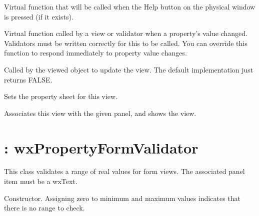 
Virtual function that will be called when the Help button on the physical window is pressed (if it exists).

\label{wxpropertyviewonpropertychanged}


Virtual function called by a view or validator when a property's value changed. Validators
must be written correctly for this to be called. You can override this function
to respond immediately to property value changes.

\label{wxpropertyviewonupdateview}


Called by the viewed object to update the view. The default implementation just returns
FALSE.

\label{wxpropertyviewsetpropertysheet}


Sets the property sheet for this view.

\label{wxpropertyviewshowview}


Associates this view with the given panel, and shows the view.

\section{: wxPropertyFormValidator}\label{wxrealformvalidator}


This class validates a range of real values for form views. The associated panel item must be a wxText.



Constructor. Assigning zero to minimum and maximum values indicates that there is no range to check.


